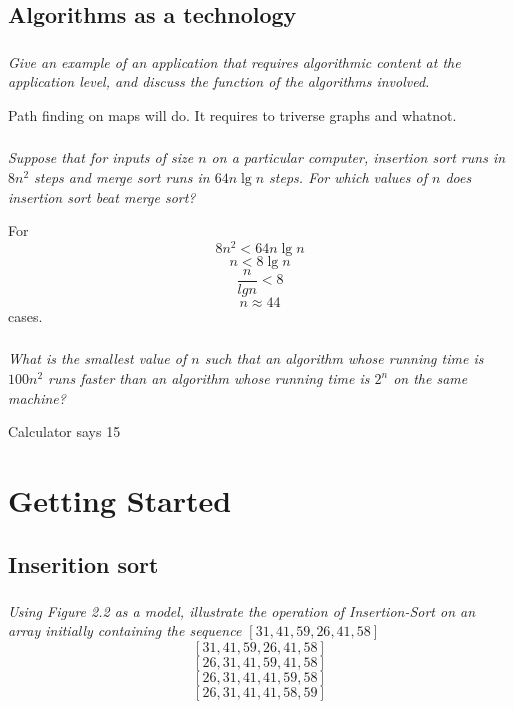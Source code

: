 \documentclass[11pt,oneside,titlepage]{book}
\begin{document}
\section{Algorithms as a technology}

\subsection{}

\textit{Give an example of an application that requires algorithmic content at the
  application level, and discuss the function of the algorithms involved.}

Path finding on maps will do. It requires to triverse graphs and whatnot.

\subsection{}

\textit{Suppose that for inputs of size $n$ on a particular computer, insertion sort
  runs in $8n^2$ steps and merge sort runs in $64n \lg n$ steps. For which values of $n$
  does insertion sort beat merge sort?}

For
$$8 n^2 < 64 n \lg n$$
$$n <8 \lg n$$
$$\frac{n}{lg n} < 8$$
$$n \approx 44$$
cases.


\subsection{}

\textit{What is the smallest value of $n$ such that an algorithm whose running time is $100n^2$
  runs faster than an algorithm whose running time is $2^n$ on the same machine?}

Calculator says 15

\chapter{Getting Started}


\section{Inserition sort}

\subsection{}

\textit{Using Figure 2.2 as a model, illustrate the operation of Insertion-Sort on an
  array initially containing the sequence $[31, 41, 59, 26, 41, 58]$}
$$[31, 41, 59, 26, 41, 58]$$
$$[26, 31, 41, 59, 41, 58]$$
$$[26, 31, 41, 41, 59, 58]$$
$$[26, 31, 41, 41, 58, 59]$$
\end{document}
